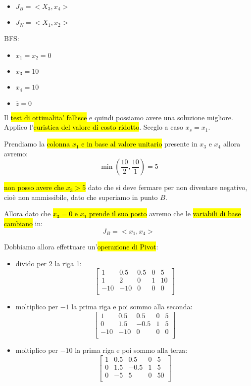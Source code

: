 \begin{itemize}
	\item $J_B = <X_3, x_4>$
	\item $J_N = <X_1, x_2>$
\end{itemize}

BFS:

\begin{itemize}
	\item $x_1 = x_2 = 0$
	\item $x_3 = 10$
	\item $x_4 = 10$
	\item $\overline{z} = 0$
\end{itemize}

Il \hl{test di ottimalita' fallisce} e quindi possiamo avere una soluzione migliore. Applico l'\hl{euristica del valore di costo ridotto}. Sceglo a caso $x_s = x_1$.

Prendiamo la \hl{colonna $x_1$ e in base al valore unitario} presente in $x_3$ e $x_4$ allora avremo:
$$\min (\frac{10}{2}, \frac{10}{1}) = 5$$

\hl{non posso avere che $x_3 > 5$} dato che si deve fermare per non diventare negativo, cioè non ammissibile, dato che superiamo in punto $B$.

Allora dato che \hl{$x_3 = 0$ e $x_1$ prende il suo posto} avremo che le \hl{variabili di base cambiano} in:
$$J_B = <x_1, x_4>$$

Dobbiamo allora effettuare un'\hl{operazione di Pivot}:

\begin{itemize}
	\item divido per $2$ la riga 1:
		$$
		\left[ {\begin{array}{ccccc}
			1 & 0.5 & 0.5 & 0 & 5\\
			1 & 2 & 0 & 1 & 10\\
			-10 & -10 & 0 & 0 & 0\\
		\end{array} } \right]
		$$

		\item moltiplico per $-1$ la prima riga e poi sommo alla seconda:
		$$
		\left[ {\begin{array}{ccccc}
			1 & 0.5 & 0.5 & 0 & 5\\
			0 & 1.5 & -0.5 & 1 & 5\\
			-10 & -10 & 0 & 0 & 0\\
		\end{array} } \right]
		$$

		\item moltiplico per $-10$ la prima riga e poi sommo alla terza:
		$$
		\left[ {\begin{array}{ccccc}
			1 & 0.5 & 0.5 & 0 & 5\\
			0 & 1.5 & -0.5 & 1 & 5\\
			0 & -5 & 5 & 0 & 50\\
		\end{array} } \right]
		$$
\end{itemize}

